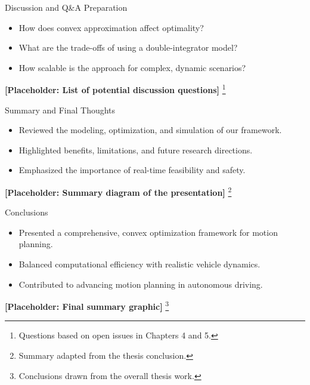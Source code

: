\documentclass[shortpres,aspectratio=43]{beamer}
\newcommand\blfootnote[1]{%
  \begingroup
  \renewcommand\thefootnote{}\footnote{#1}%
  \addtocounter{footnote}{-1}%
  \endgroup
}
\begin{document}
\begin{frame}{Discussion and Q\&A Preparation}
  \begin{itemize}
    \item How does convex approximation affect optimality?
    \item What are the trade-offs of using a double-integrator model?
    \item How scalable is the approach for complex, dynamic scenarios?
  \end{itemize}
  \centering
  \textbf{[Placeholder: List of potential discussion questions]}
  \blfootnote{\tiny Questions based on open issues in Chapters 4 and 5.}
\end{frame}

\begin{frame}{Summary and Final Thoughts}
  \begin{itemize}
    \item Reviewed the modeling, optimization, and simulation of our framework.
    \item Highlighted benefits, limitations, and future research directions.
    \item Emphasized the importance of real-time feasibility and safety.
  \end{itemize}
  \centering
  \textbf{[Placeholder: Summary diagram of the presentation]}
  \blfootnote{\tiny Summary adapted from the thesis conclusion.}
\end{frame}

\begin{frame}{Conclusions}
  \begin{itemize}
    \item Presented a comprehensive, convex optimization framework for motion planning.
    \item Balanced computational efficiency with realistic vehicle dynamics.
    \item Contributed to advancing motion planning in autonomous driving.
  \end{itemize}
  \centering
  \textbf{[Placeholder: Final summary graphic]}
  \blfootnote{\tiny Conclusions drawn from the overall thesis work.}
\end{frame}
\end{document}
